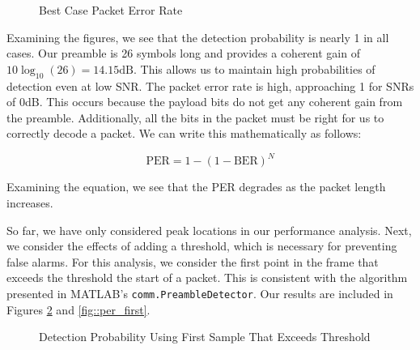 \documentclass{article}
\begin{document}
\begin{figure}[H]
	\centerline{}
	\caption{Best Case Packet Error Rate}
	\label{fig::per_peak}
\end{figure}

\noindent Examining the figures, we see that the detection probability is nearly 1 in all cases. Our preamble is 26 symbols long and provides a coherent gain of $10\log_{10}(26) = 14.15 \text{dB}$. This allows us to maintain high probabilities of detection even at low SNR. The packet error rate is high, approaching 1 for SNRs of 0dB. This occurs because the payload bits do not get any coherent gain from the preamble. Additionally, all the bits in the packet must be right for us to correctly decode a packet. We can write this mathematically as follows:

\begin{equation*}
	\text{PER} = 1 - (1 - \text{BER})^N
\end{equation*}

\noindent Examining the equation, we see that the PER degrades as the packet length increases.

So far, we have only considered peak locations in our performance analysis. Next, we consider the effects of adding a threshold, which is necessary for preventing false alarms. For this analysis, we consider the first point in the frame that exceeds the threshold the start of a packet. This is consistent with the algorithm presented in MATLAB's \texttt{comm.PreambleDetector}. Our results are included in Figures \ref{fig::detection_probability_first} and \ref{fig::per_first}.

\begin{figure}[H]
	\centerline{}
	\caption{Detection Probability Using First Sample That Exceeds Threshold}
	\label{fig::detection_probability_first}
\end{figure}
\end{document}

